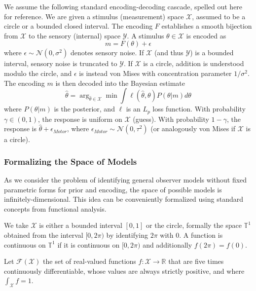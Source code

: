 We assume the following standard encoding-decoding cascade, spelled out here for reference.
We are given a stimulus (measurement) space $\mathcal{X}$, assumed to be a circle or a bounded closed interval.
The encoding $F$ establishes a smooth bijection from $\mathcal{X}$ to the sensory (internal) space $\mathcal{Y}$.
A stimulus $\theta \in \mathcal{X}$ is encoded as
\begin{equation}
    m = F(\theta) + \epsilon
\end{equation}
where $\epsilon \sim \mathcal{N}(0,\sigma^2)$ denotes sensory noise. If $\mathcal{X}$ (and thus $\mathcal{Y}$) is a bounded interval, sensory noise is truncated to $\mathcal{Y}$. If $\mathcal{X}$ is a circle, addition is understood modulo the circle, and $\epsilon$ is instead von Mises with concentration parameter $1/\sigma^2$.
The encoding $m$ is then decoded into the Bayesian estimate
\begin{equation}
    \widehat{\theta} = \arg_{\widehat{\theta}\in\mathcal{X}}\min\int\ell(\hat{\theta},\theta) P(\theta|m)d\theta
\end{equation}
where $P(\theta|m)$ is the posterior, and $\ell$ is an $L_p$ loss function.
With probability $\gamma \in (0,1)$, the response is uniform on $\mathcal{X}$ (guess).
With probability $1-\gamma$, the response is $\widehat{\theta} + \epsilon_{Motor}$, where $\epsilon_{Motor} \sim \mathcal{N}(0,\tau^2)$ (or analogously von Mises if $\mathcal{X}$ is a circle).

\subsubsection{Formalizing the Space of Models}\label{sec:space-of-models}
As we consider the problem of identifying general observer models without fixed parametric forms for prior and encoding, the space of possible models is infinitely-dimensional. This idea can be conveniently formalized using standard  concepts from functional analysis.

We take $\mathcal{X}$ is either a bounded interval $[0,1]$ or the circle, formally the space $\mathbb{T}^1$ obtained from the interval $[0,2\pi)$ by identifying $2\pi$ with $0$.
A function is continuous on $\mathbb{T}^1$ if it is continuous on $[0,2\pi)$ and additionally $f(2\pi) = f(0)$. 

\begin{defin}
Let $\mathcal{F}(\mathcal{X})$ the set of real-valued functions $f : \mathcal{X} \rightarrow \mathbb{R}$ that are five times continuously differentiable, whose values are always strictly positive, and where $\int_{\mathcal{X}} f = 1$.


    
\end{defin}

